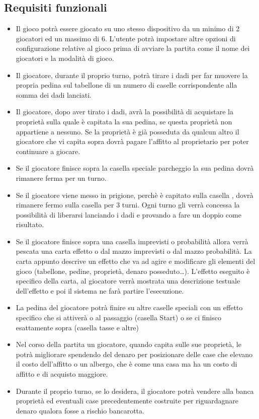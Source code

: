 \subsection{Requisiti funzionali}
\begin{itemize}
    \item Il gioco potrà essere giocato su uno stesso dispositivo da un minimo di 2 giocatori ed un massimo di 6. L'utente
    potrà impostare altre opzioni di configurazione relative al gioco prima di avviare la partita come il nome dei giocatori e 
    la modalità di gioco.
	\item Il giocatore, durante il proprio turno, potrà tirare i dadi per far muovere la propria pedina sul tabellone di un numero di 
    caselle corrispondente alla somma dei dadi lanciati.
	\item Il giocatore, dopo aver tirato i dadi, avrà la possibilità di acquistare la proprietà sulla quale 
    è capitata la sua pedina, se questa proprietà non appartiene a nessuno. 
    Se la proprietà è già posseduta da qualcun altro il giocatore che vi capita sopra dovrà pagare l’affitto al proprietario 
    per poter continuare a giocare.
    \item Se il giocatore finisce sopra la casella speciale parcheggio la sua pedina
    dovrà rimanere ferma per un turno.
    \item Se il giocatore viene messo in prigione, perchè è capitato sulla casella ,
    dovrà rimanere fermo sulla casella  per 3 turni. Ogni turno gli verrà concessa la possibilità di liberarsi lanciando i dadi
    e provando a fare un doppio come risultato.
    \item Se il giocatore finisce sopra una casella imprevisti o probabilità allora verrà pescata una carta effetto
    o dal mazzo imprevisti o dal mazzo probabilità. La carta appunto descrive un effetto che va ad agire e modificare gli
    elementi del gioco (tabellone, pedine, proprietà, denaro posseduto\dots). L'effetto eseguito è specifico della carta,
    al giocatore verrà mostrata una descrizione testuale dell'effetto e poi il sistema ne farà partire l'esecuzione.
    \item La pedina del giocatore potrà finire su altre caselle speciali con un effetto specifico che si attiverà o al 
    passaggio (casella Start) o se ci finisco esattamente sopra (casella tasse e altre)
    \item Nel corso della partita un giocatore, quando capita sulle sue proprietà, le potrà migliorare spendendo
    del denaro per posizionare delle case che elevano il costo dell’affitto o un albergo, che è come una casa 
    ma ha un costo di affitto e di acquisto maggiore.
    \item Durante il proprio turno, se lo desidera, il giocatore potrà vendere alla banca 
    proprietà ed eventuali case precedentemente costruite per riguardagnare denaro qualora fosse a rischio
    bancarotta.
\end{itemize}


